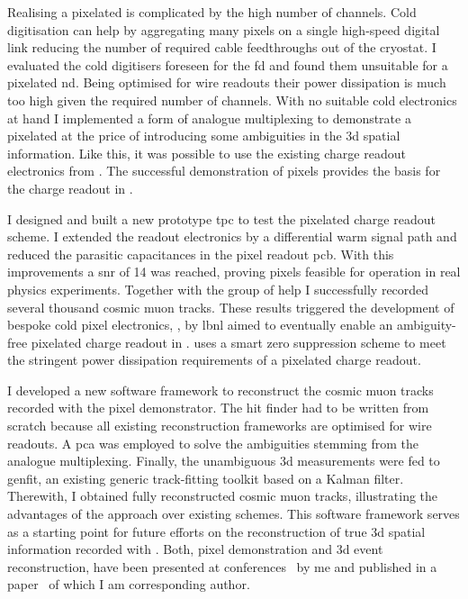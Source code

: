 Realising a pixelated \lartpc{} is complicated by the high number of channels.
Cold digitisation can help by aggregating many pixels on a single high-speed digital link reducing the number of required cable feedthroughs out of the cryostat.
I evaluated the cold digitisers foreseen for the \dune{} \gls{fd} and found them unsuitable for a pixelated \gls{nd}.
Being optimised for wire readouts their power dissipation is much too high given the required number of channels.
With no suitable cold electronics at hand I implemented a form of analogue multiplexing to demonstrate a pixelated \lartpc{} at the price of introducing some ambiguities in the \gls{3d} spatial information.
Like this, it was possible to use the existing charge readout electronics from \AT{}.
The successful demonstration of pixels provides the basis for the charge readout in \AC{}.

I designed and built a new prototype \gls{tpc} to test the pixelated charge readout scheme.
I extended the \AT{} readout electronics by a differential warm signal path and reduced the parasitic capacitances in the pixel readout \gls{pcb}.
With this improvements a \gls{snr} of \num{14} was reached, proving pixels feasible for operation in real physics experiments.
Together with the \lar{} group of \gls{help} I successfully recorded several thousand cosmic muon tracks.
These results triggered the development of bespoke cold pixel electronics, \larpix{}, by \gls{lbnl} aimed to eventually enable an ambiguity-free pixelated charge readout in \AC{}.
\larpix{} uses a smart zero suppression scheme to meet the stringent power dissipation requirements of a pixelated charge readout.

I developed a new software framework to reconstruct the cosmic muon tracks recorded with the pixel demonstrator.
The hit finder had to be written from scratch because all existing \lartpc{} reconstruction frameworks are optimised for wire readouts.
A \gls{pca} was employed to solve the ambiguities stemming from the analogue multiplexing.
Finally, the unambiguous \gls{3d} measurements were fed to \gls{genfit}, an existing generic track-fitting toolkit based on a Kalman filter.
Therewith, I obtained fully reconstructed cosmic muon tracks, illustrating the advantages of the \AC{} approach over existing schemes.
This software framework serves as a starting point for future efforts on the reconstruction of true \gls{3d} spatial information recorded with \AC{}.
Both, pixel demonstration and \gls{3d} event reconstruction, have been presented at conferences~\cite{pixel_proceedings} by me and published in a paper~\cite{pixel_paper} of which I am corresponding author.

